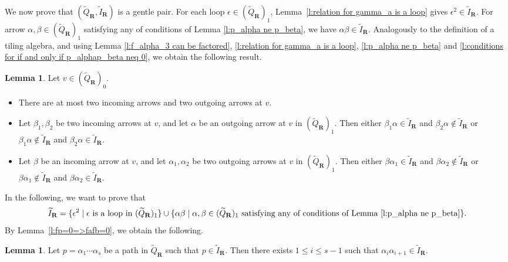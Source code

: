 \documentclass[a4paper,10pt]{amsart}
\theoremstyle{plain}          %
\theoremstyle{definition}
\newtheorem{lem}[theorem]{Lemma}
\begin{document}
We now prove that $(\widetilde{Q}_{\mathbf{R}},\widetilde{I}_{\mathbf{R}})$ is a gentle pair. For each loop $\epsilon\in (\widetilde{Q}_{\mathbf{R}})_1$, Lemma~\ref{l:relation for gamma_a is a loop} gives $\epsilon^2\in \widetilde{I}_{\mathbf{R}}$.
 For arrow $\alpha,\beta\in (\widetilde{Q}_{\mathbf{R}})_1$ satisfying 
any of conditions of  Lemma \ref{l:p_alpha ne p_beta}, we have $\alpha\beta\in  \widetilde{I}_{\mathbf{R}}$. Analogously to the definition of a tiling algebra, and using  Lemma \ref{l:f_alpha_3 can be factored}, \ref{l:relation for gamma_a is a loop}, \ref{l:p_alpha ne p_beta} and \ref{l:conditions for if and only if p_alphap_beta neq 0}, we obtain the following result.
\begin{lem}\label{l: Q^R satisfy g1-g3}
   Let $v\in (\widetilde{Q}_{\mathbf{R}})_0$.
   \begin{itemize}
       \item [(1)]  There are at most two incoming arrows and two outgoing arrows at $v$.
       \item [(2)]Let $\beta_1,\beta_2$ be two incoming arrows at $v$, and let $\alpha$ be an outgoing arrow at $v$ in $(\widetilde{Q}_{\mathbf{R}})_1$. Then either $\beta_1\alpha\in \widetilde{I}_{\mathbf{R}}$ and $\beta_2\alpha\notin \widetilde{I}_{\mathbf{R}}$ or $\beta_1\alpha\notin \widetilde{I}_{\mathbf{R}}$ and $\beta_2\alpha\in \widetilde{I}_{\mathbf{R}}$.
       \item [(3)]Let $\beta$ be an incoming arrow at $v$, and let $\alpha_1,\alpha_2$ be two outgoing arrows at $v$  in $(\widetilde{Q}_{\mathbf{R}})_1$. Then either $\beta\alpha_1\in \widetilde{I}_{\mathbf{R}}$ and $\beta\alpha_2\notin \widetilde{I}_{\mathbf{R}}$ or $\beta\alpha_1\notin \widetilde{I}_{\mathbf{R}}$ and $\beta\alpha_2\in \widetilde{I}_{\mathbf{R}}.$
   \end{itemize}
   \end{lem}
   In the following, we want to prove that  $$\widetilde{I}_{\mathbf{R}}=\{\epsilon^2\mid \epsilon \text{ is a loop in } (\widetilde{Q}_{\mathbf{R}})_1\}\cup\{\alpha\beta\mid \alpha,\beta\in (\widetilde{Q}_{\mathbf{R}})_1 \text{ satisfying 
any of conditions of  Lemma } \ref{l:p_alpha ne p_beta}\}.$$
By Lemma~\ref{l:fp=0=>fafb=0}, we obtain the following.  
\begin{lem}\label{l:p=0=> ab=0}
Let $p=\alpha_1\cdots\alpha_s$ be a path in $\widetilde{Q}_{\mathbf{R}}$ such that $p\in \widetilde{I}_{\mathbf{R}}$. Then there exists $1\leq i\leq s-1$ such that $\alpha_i\alpha_{i+1}\in \widetilde{I}_{\mathbf{R}}$.
\end{lem}
\end{document}
